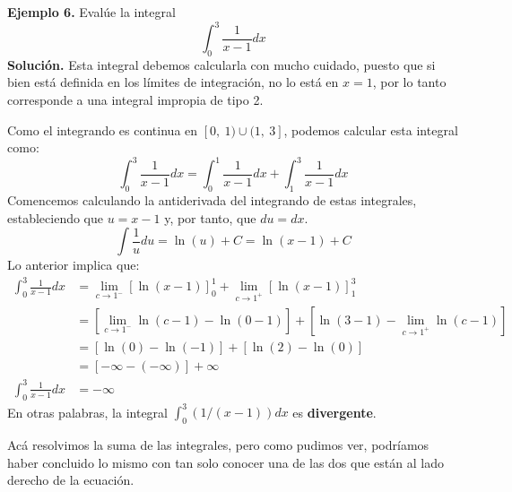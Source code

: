 \documentclass[12pt]{article}
\begin{document}
\textbf{Ejemplo 6.} Evalúe la integral
\[
  \int_{0}^{3} \frac{1}{x - 1} dx
\]
\textbf{Solución.} Esta integral debemos calcularla con mucho cuidado, puesto que si bien está definida en los límites de integración, no lo está en $x = 1$, por lo tanto corresponde a una integral impropia de tipo 2.

Como el integrando es continua en $[0, \ 1) \cup (1, \ 3]$, podemos calcular esta integral como:
\[
  \int_{0}^{3} \frac{1}{x - 1} dx = \int_{0}^{1} \frac{1}{x - 1} dx + \int_{1}^{3} \frac{1}{x - 1} dx
\]
Comencemos calculando la antiderivada del integrando de estas integrales, estableciendo que $u = x - 1$ y, por tanto, que $du = dx$.
\[
  \int \frac{1}{u} du = \ln(u) + C = \ln(x - 1) + C
\]
Lo anterior implica que:
\begin{align*}
  \int_{0}^{3} \frac{1}{x - 1} dx &= \lim_{c \to 1^{-}} [\ln(x - 1)]_{0}^{1} + \lim_{c \to 1^{+}} [\ln(x - 1)]_{1}^{3} \\
                                  &= \left[\lim_{c \to 1^{-}} \ln(c - 1) - \ln(0 - 1)\right] + \left[\ln(3 - 1) - \lim_{c \to 1^{+}} \ln(c - 1)\right] \\
                                  &= [\ln(0) - \ln(-1)] + [\ln(2) - \ln(0)] \\
                                  &= [-\infty - (-\infty)] + \infty \\
  \int_{0}^{3} \frac{1}{x - 1} dx &= -\infty
\end{align*}
En otras palabras, la integral $\int_{0}^{3} (1/(x - 1)) dx$ es \textbf{divergente}.

Acá resolvimos la suma de las integrales, pero como pudimos ver, podríamos haber concluido lo mismo con tan solo conocer una de las dos que están al lado derecho de la ecuación.
\end{document}
